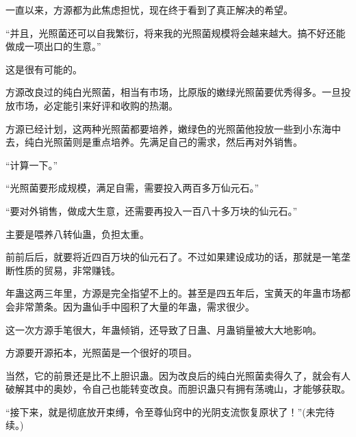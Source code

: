 \begin{this_body}
一直以来，方源都为此焦虑担忧，现在终于看到了真正解决的希望。

“并且，光照菌还可以自我繁衍，将来我的光照菌规模将会越来越大。搞不好还能做成一项出口的生意。”

这是很有可能的。

方源改良过的纯白光照菌，相当有市场，比原版的嫩绿光照菌要优秀得多。一旦投放市场，必定能引来好评和收购的热潮。

方源已经计划，这两种光照菌都要培养，嫩绿色的光照菌他投放一些到小东海中去，纯白光照菌则是重点培养。先满足自己的需求，然后再对外销售。

“计算一下。”

“光照菌要形成规模，满足自需，需要投入两百多万仙元石。”

“要对外销售，做成大生意，还需要再投入一百八十多万块的仙元石。”

主要是喂养八转仙蛊，负担太重。

前前后后，就要将近四百万块的仙元石了。不过如果建设成功的话，那就是一笔垄断性质的贸易，非常赚钱。

年蛊这两三年里，方源是完全指望不上的。甚至是四五年后，宝黄天的年蛊市场都会非常萧条。因为蛊仙手中囤积了大量的年蛊，需求很少。

这一次方源手笔很大，年蛊倾销，还导致了日蛊、月蛊销量被大大地影响。

方源要开源拓本，光照菌是一个很好的项目。

当然，它的前景还是比不上胆识蛊。因为改良后的纯白光照菌卖得久了，就会有人破解其中的奥妙，令自己也能转变改良。而胆识蛊只有拥有荡魂山，才能够获取。

“接下来，就是彻底放开束缚，令至尊仙窍中的光阴支流恢复原状了！”(未完待续。)

\end{this_body}

